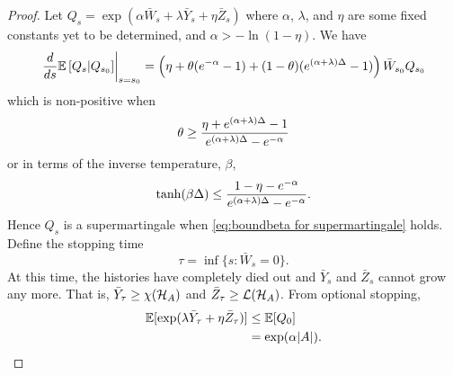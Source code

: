 \begin{proof}
		Let $Q_s = \exp \left(\alpha \bar{W}_s + \lambda \bar{Y}_s + \eta \bar{Z}_s\right)$ where $\alpha$, $\lambda$, and $\eta$ are some fixed constants yet to be determined, and $\alpha > -\ln(1 - \eta)$. 
		We have
		\begin{equation}
			\label{eq:martingalederivative}
			\left.\frac{d}{ds} \mathbb{E}\left[Q_{s} | Q_{s_0}\right] \right|_{s = s_0} = \left(\eta + \theta (e^{-\alpha} - 1) + (1 - \theta)(e^{(\alpha + \lambda)\Delta} - 1)\right)\bar{W}_{s_0} Q_{s_0}
		\end{equation}
		which is non-positive when
		\begin{equation}
			\theta \geq \frac{\eta + e^{(\alpha + \lambda)\Delta} - 1}{e^{(\alpha + \lambda)\Delta} - e^{-\alpha}}
		\end{equation}
		or in terms of the inverse temperature, $\beta$, 
		\begin{equation}
			\label{eq:boundbeta for supermartingale}
			\tanh(\beta\Delta) \leq \frac{1 - \eta - e^{-\alpha}}{e^{(\alpha+\lambda)\Delta} - e^{-\alpha}}.
		\end{equation}
		Hence $Q_s$ is a supermartingale when \eqref{eq:boundbeta for supermartingale} holds.
		Define the stopping time 
		\begin{equation}
			\tau = \inf\{s: \bar{W}_s = 0\}.
		\end{equation}
		At this time, the histories have completely died out and $\bar{Y}_s$ and $\bar{Z}_s$ cannot grow any more. That is, $\bar{Y}_\tau \geq \chi(\mathcal{H}_A)$ and $\bar{Z}_\tau \geq \mathcal{L}(\mathcal{H}_A)$. From optional stopping,
		\begin{align}
			\mathbb{E}[\exp(\lambda \bar{Y}_\tau  + \eta \bar{Z}_\tau)] &\leq \mathbb{E}[Q_{0}]\\
			&= \exp(\alpha |A|).
		\end{align}
	\end{proof}
